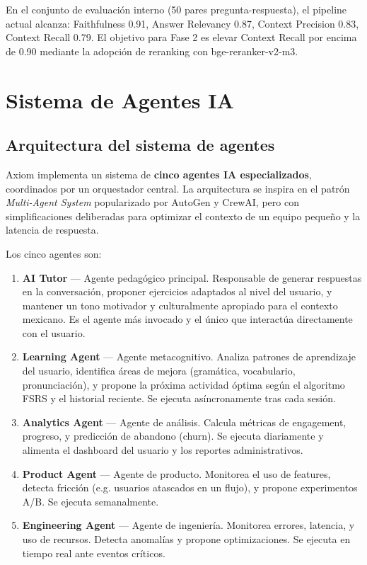 \documentclass[10pt,a4paper,oneside]{report}
\begin{document}
En el conjunto de evaluación interno (50 pares pregunta-respuesta), el pipeline actual alcanza: Faithfulness 0.91, Answer Relevancy 0.87, Context Precision 0.83, Context Recall 0.79. El objetivo para Fase 2 es elevar Context Recall por encima de 0.90 mediante la adopción de reranking con bge-reranker-v2-m3.

\chapter{Sistema de Agentes IA}

\section{Arquitectura del sistema de agentes}
Axiom implementa un sistema de \textbf{cinco agentes IA especializados}, coordinados por un orquestador central. La arquitectura se inspira en el patrón \textit{Multi-Agent System} popularizado por AutoGen y CrewAI, pero con simplificaciones deliberadas para optimizar el contexto de un equipo pequeño y la latencia de respuesta.

Los cinco agentes son:

\begin{enumerate}[leftmargin=1.6em]
\item \textbf{AI Tutor} — Agente pedagógico principal. Responsable de generar respuestas en la conversación, proponer ejercicios adaptados al nivel del usuario, y mantener un tono motivador y culturalmente apropiado para el contexto mexicano. Es el agente más invocado y el único que interactúa directamente con el usuario.
\item \textbf{Learning Agent} — Agente metacognitivo. Analiza patrones de aprendizaje del usuario, identifica áreas de mejora (gramática, vocabulario, pronunciación), y propone la próxima actividad óptima según el algoritmo FSRS y el historial reciente. Se ejecuta asíncronamente tras cada sesión.
\item \textbf{Analytics Agent} — Agente de análisis. Calcula métricas de engagement, progreso, y predicción de abandono (churn). Se ejecuta diariamente y alimenta el dashboard del usuario y los reportes administrativos.
\item \textbf{Product Agent} — Agente de producto. Monitorea el uso de features, detecta fricción (e.g. usuarios atascados en un flujo), y propone experimentos A/B. Se ejecuta semanalmente.
\item \textbf{Engineering Agent} — Agente de ingeniería. Monitorea errores, latencia, y uso de recursos. Detecta anomalías y propone optimizaciones. Se ejecuta en tiempo real ante eventos críticos.
\end{enumerate}
\end{document}
